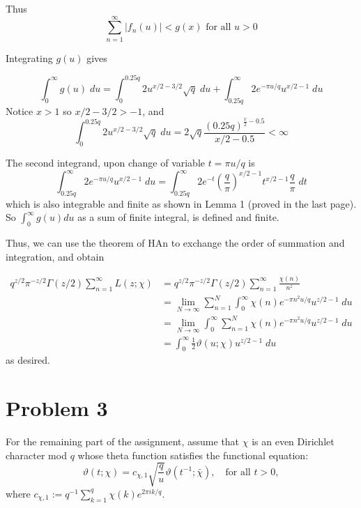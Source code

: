 \documentclass{article}
\theoremstyle{definition}
\theoremstyle{definition}
\theoremstyle{remark}
\renewcommand{\t}{\vartheta}
\newcommand{\x}{\chi}
\begin{document}
Thus 
$$
\sum_{n=1}^{\infty} |f_n(u)| < g(x) \text{ for all } u > 0
$$

Integrating $g(u)$ gives 

\begin{dmath}
\int_0^{\infty} g(u) \;du = \int_0^{0.25q} 2 u^{x/2 - 3/2}\sqrt{q} \;du + \int_{0.25q}^{\infty} 2e^{-\pi u / q} u^{x/2 - 1} \;du
\end{dmath}
Notice $x > 1$ so $x/2 - 3/2 > -1$, and
$$
\int_0^{0.25q} 2 u^{x/2 - 3/2}\sqrt{q} \;du  = 2 \sqrt{q} \frac{(0.25q)^{\frac{x}{2} - 0.5}}{x/2 - 0.5} < \infty
$$

The second integrand, upon change of variable $t = \pi u /q$ is
$$
\int_{0.25q}^{\infty} 2e^{-\pi u / q} u^{x/2 - 1} \;du = \int_{0.25q}^{\infty} 2e^{-t} \left(\frac{q}{\pi}\right)^{x/2 - 1} t^{x/2 - 1} \frac{q}{\pi} \;dt 
$$
which is also integrable and finite as shown in Lemma 1 (proved in the last page).  So $\int_0^{\infty}g(u)du$ as a sum of finite integral, is defined and finite.

Thus, we can use the theorem of HAn to exchange the order of summation and integration, and obtain

\begin{align}
	q^{z/2}\pi^{-z/2}\Gamma(z/2)  \sum_{n=1}^{\infty} L(z; \x) 
	&=q^{z/2}\pi^{-z/2}\Gamma(z/2)  \sum_{n=1}^{\infty} \frac{\x(n)}{n^z} \\
	&= \lim_{N \rightarrow \infty}\sum_{n=1}^{N} \int_{0}^{\infty} \chi(n)e^{-\pi n^2 u/q} u^{z/2-1} \;du \\
	&= \lim_{N \rightarrow \infty} \int_{0}^{\infty}\sum_{n=1}^{N} \chi(n)e^{-\pi n^2 u/q} u^{z/2-1} \;du \\
	&= \int_{0}^{\infty} \frac{1}{2}\t(u; \x) u^{z/2-1} \;du
\end{align}
as desired.










\newpage


\section*{Problem 3}
For the remaining part of the assignment, assume that $\chi$ is an even Dirichlet character mod $q$ whose theta function satisfies the functional equation:
\begin{equation}
	\vartheta(t;\chi) = c_{\chi,1} \sqrt{\frac{q}{u}} \vartheta(t^{-1};\bar{\chi}), \quad \text{for all } t > 0,
\end{equation}
where $c_{\chi,1} := q^{-1} \sum_{k=1}^{q} \chi(k)e^{2\pi i k/q}$.
\end{document}
